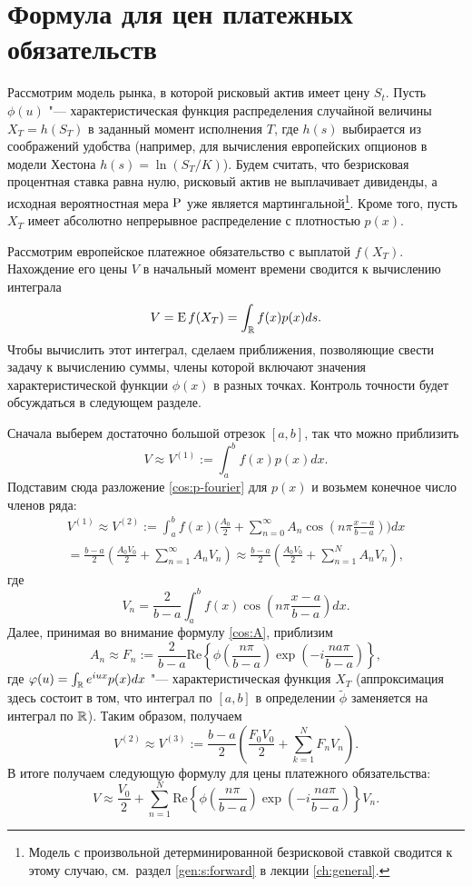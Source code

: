 \section{Формула для цен платежных обязательств}

Рассмотрим модель рынка, в которой рисковый актив имеет цену $S_t$. 
Пусть $\phi(u)$ "--- характеристическая функция распределения случайной величины $X_T = h(S_T)$ в заданный момент исполнения $T$, где $h(s)$ выбирается из соображений удобства (например, для вычисления европейских опционов в модели Хестона $h(s) = \ln(S_T/K)$).
Будем считать, что безрисковая процентная ставка равна нулю, рисковый актив не выплачивает дивиденды, а исходная вероятностная мера $\P$ уже является мартингальной\footnote{Модель с произвольной детерминированной безрисковой ставкой сводится к этому случаю, см.~раздел \ref{gen:s:forward} в лекции \ref{ch:general}.}.
Кроме того, пусть $X_T$ имеет абсолютно непрерывное распределение с плотностью $p(x)$. 

Рассмотрим европейское платежное обязательство с выплатой $f(X_T)$.
Нахождение его цены $V$ в начальный момент времени сводится к вычислению интеграла
\[
V = \E f(X_T) = \int_\R f(x) p(x) ds.
\]
Чтобы вычислить этот интеграл, сделаем приближения, позволяющие свести задачу к вычислению суммы, члены которой включают значения характеристической функции $\phi(x)$ в разных точках.
Контроль точности будет обсуждаться в следующем разделе.

Сначала выберем достаточно большой отрезок $[a,b]$, так что можно приблизить
\begin{equation}
\label{cos:V1}
V \approx V^{(1)} := \int_{a}^{b} f(x) p(x) dx.
\end{equation}
Подставим сюда разложение \eqref{cos:p-fourier} для $p(x)$ и возьмем конечное число членов ряда:
\begin{multline}
\label{cos:V2}
V^{(1)} \approx V^{(2)} := \int_a^b f(x) \biggl( \frac{A_0}{2} + \sum_{n=0}^\infty A_n \cos\left(n\pi\frac{x-a}{b-a}\right) \biggr) dx \\
= \frac{b-a}{2} \left( \frac{A_0V_0}{2} + \sum_{n=1}^\infty A_nV_n  \right)
\approx \frac{b-a}{2} \left( \frac{A_0V_0}{2} + \sum_{n=1}^{N} A_nV_n \right),
\end{multline}
где
\[
V_n = \frac{2}{b-a}\int_a^b f(x) \cos\left(n\pi\frac{x-a}{b-a}\right) dx.
\]
Далее, принимая во внимание формулу \eqref{cos:A}, приблизим 
\begin{equation}
\label{cos:F}
A_n \approx F_n := \frac{2}{b-a} \mathrm{Re}\left\{ \phi\left(\frac{n\pi}{b-a}\right)\exp\left(-i\frac{na\pi}{b-a}\right) \right\},
\end{equation}
где $\phi(u)=\int_\R e^{iux}p(x)dx$ "--- характеристическая функция $X_T$ (аппроксимация здесь состоит в том, что интеграл по $[a,b]$ в определении $\tilde\phi$ заменяется на интеграл по $\R$).
Таким образом, получаем 
\[
V^{(2)} \approx V^{(3)} := \frac{b-a}{2} 
\left(\frac{F_0V_0}{2} + \sum_{k=1}^N F_nV_n\right).
\]
В итоге получаем следующую формулу для цены платежного обязательства:
\[
V\approx 
\frac{V_0}{2} 
  + \sum_{n=1}^N \mathrm{Re}\left\{ 
    \phi\left(\frac{n\pi}{b-a}\right)\exp\left(-i\frac{na\pi}{b-a}\right) 
  \right\} V_n.
\]

